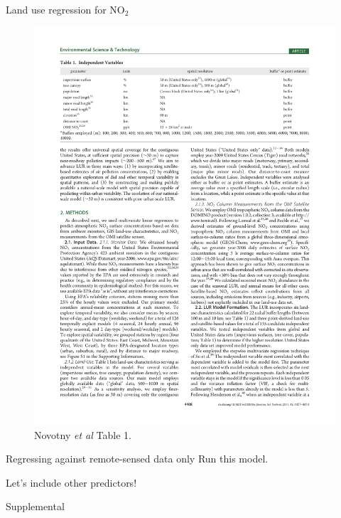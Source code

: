 \documentclass[aspectratio=169]{beamer}
\begin{document}
\begin{frame}{Land use regression for NO$_2$}
\begin{figure}
\includegraphics[height=0.6\textheight]{novotny_tab1_4}
\caption*{Novotny \textit{et al} Table 1.  }
\end{figure}

\end{frame}


\begin{frame}{Regressing against remote-sensed data only}
  Run this model.
\end{frame}


\begin{frame}{Let's include other predictors!}

\end{frame}

\begin{frame}
Supplemental
\end{frame}
\end{document}
